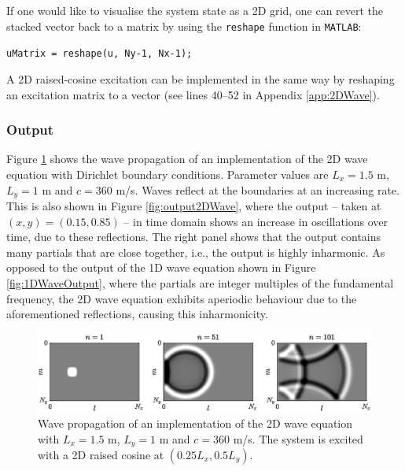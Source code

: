 If one would like to visualise the system state as a 2D grid, one can revert the stacked vector back to a matrix by using the \texttt{reshape} function in \texttt{MATLAB}:
\begin{center}
    \texttt{uMatrix = reshape(u, Ny-1, Nx-1);}
\end{center}
A 2D raised-cosine excitation can be implemented in the same way by reshaping an excitation matrix to a vector (see lines 40--52 in Appendix \ref{app:2DWave}).

\subsubsection{Output}
Figure \ref{fig:2Dpropagation} shows the wave propagation of an implementation of the 2D wave equation with Dirichlet boundary conditions. Parameter values are $L_x = 1.5$ m, $L_y = 1$ m and $c= 360$ m/s. Waves reflect at the boundaries at an increasing rate. This is also shown in Figure \ref{fig:output2DWave}, where the output -- taken at $(x,y) = (0.15, 0.85)$ -- in time domain shows an increase in oscillations over time, due to these reflections. The right panel shows that the output contains many partials that are close together, i.e., the output is highly inharmonic. As opposed to the output of the 1D wave equation shown in Figure \ref{fig:1DWaveOutput}, where the partials are integer multiples of the fundamental frequency, the 2D wave equation exhibits aperiodic behaviour due to the aforementioned reflections, causing this inharmonicity.

\begin{figure}[h]
    \centering
    \includegraphics[width=\textwidth]{figures/resonators/2d/twoDPropagation.eps}
    \caption{Wave propagation of an implementation of the 2D wave equation with $L_x = 1.5$ m, $L_y = 1$ m and $c= 360$ m/s. The system is excited with a 2D raised cosine at $(0.25L_x, 0.5L_y)$.\label{fig:2Dpropagation}}
\end{figure}

